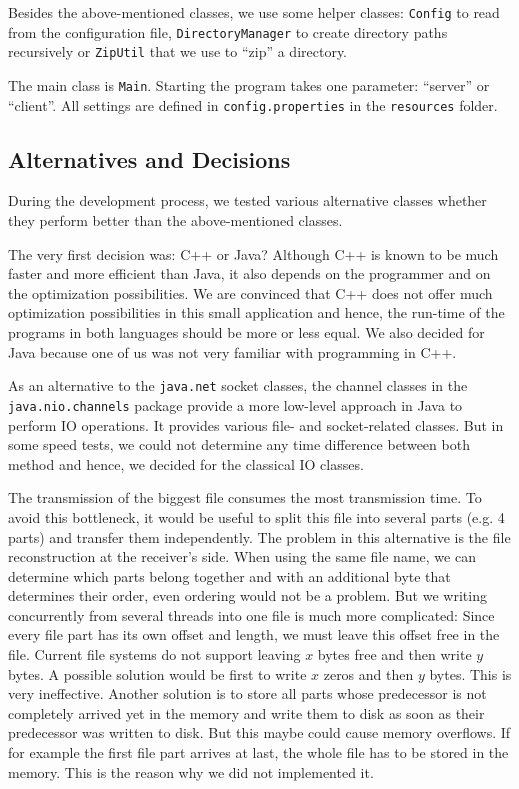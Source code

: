 \documentclass[12pt,a4paper]{article}
\begin{document}
Besides the above-mentioned classes, we use some helper classes: \lstinline!Config! to read from the configuration file, \lstinline!DirectoryManager! to create directory paths recursively or \lstinline!ZipUtil! that we use to ``zip'' a directory.

The main class is \lstinline!Main!. Starting the program takes one parameter: ``server'' or ``client''. All settings are defined in \lstinline!config.properties! in the \lstinline!resources! folder.

\subsection{Alternatives and Decisions}
During the development process, we tested various alternative classes whether they perform better than the above-mentioned classes.

The very first decision was: C++ or Java? Although C++ is known to be much faster and more efficient than Java, it also depends on the programmer and on the optimization possibilities. We are convinced that C++ does not offer much optimization possibilities in this small application and hence, the run-time of the programs in both languages should be more or less equal. We also decided for Java because one of us was not very familiar with programming in C++.

As an alternative to the \lstinline!java.net! socket classes, the channel classes in the \lstinline!java.nio.channels! package provide a more low-level approach in Java to perform IO operations. It provides various file- and socket-related classes. But in some speed tests, we could not determine any time difference between both method and hence, we decided for the classical IO classes.

The transmission of the biggest file consumes the most transmission time. To avoid this bottleneck, it would be useful to split this file into several parts (e.g. 4 parts) and transfer them independently. The problem in this alternative is the file reconstruction at the receiver's side. When using the same file name, we can determine which parts belong together and with an additional byte that determines their order, even ordering would not be a problem. But we writing concurrently from several threads into one file is much more complicated: Since every file part has its own offset and length, we must leave this offset free in the file. Current file systems do not support leaving $x$ bytes free and then write $y$ bytes. A possible solution would be first to write $x$ zeros and then $y$ bytes. This is very ineffective. Another solution is to store all parts whose predecessor is not completely arrived yet in the memory and write them to disk as soon as their predecessor was written to disk. But this maybe could cause memory overflows. If for example the first file part arrives at last, the whole file has to be stored in the memory. This is the reason why we did not implemented it.
\end{document}

